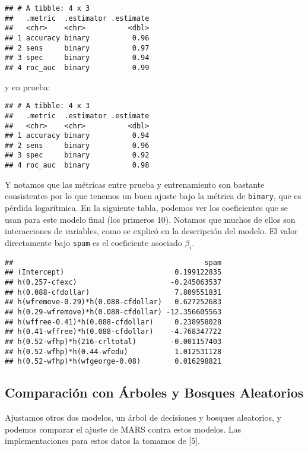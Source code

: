 \documentclass[
]{article}
\begin{document}
\begin{verbatim}
## # A tibble: 4 x 3
##   .metric  .estimator .estimate
##   <chr>    <chr>          <dbl>
## 1 accuracy binary          0.96
## 2 sens     binary          0.97
## 3 spec     binary          0.94
## 4 roc_auc  binary          0.99
\end{verbatim}

y en prueba:

\begin{verbatim}
## # A tibble: 4 x 3
##   .metric  .estimator .estimate
##   <chr>    <chr>          <dbl>
## 1 accuracy binary          0.94
## 2 sens     binary          0.96
## 3 spec     binary          0.92
## 4 roc_auc  binary          0.98
\end{verbatim}

Y notamos que las métricas entre prueba y entrenamiento son bastante
consistentes por lo que tenemos un buen ajuste bajo la métrica de
\texttt{binary}, que es pérdida logarítmica. En la siguiente tabla,
podemos ver los coeficientes que se usan para este modelo final (los
primeros 10). Notamos que muchos de ellos son interacciones de
variables, como se explicó en la descripción del modelo. El valor
directamente bajo \texttt{spam} es el coeficiente asociado \(\beta_i\).

\begin{verbatim}
##                                             spam
## (Intercept)                          0.199122835
## h(0.257-cfexc)                      -0.245063537
## h(0.088-cfdollar)                    7.809551831
## h(wfremove-0.29)*h(0.088-cfdollar)   0.627252683
## h(0.29-wfremove)*h(0.088-cfdollar) -12.356605563
## h(wffree-0.41)*h(0.088-cfdollar)     0.238958028
## h(0.41-wffree)*h(0.088-cfdollar)    -4.768347722
## h(0.52-wfhp)*h(216-crltotal)        -0.001157403
## h(0.52-wfhp)*h(0.44-wfedu)           1.012531128
## h(0.52-wfhp)*h(wfgeorge-0.08)        0.016298821
\end{verbatim}

\hypertarget{comparaciuxf3n-con-uxe1rboles-y-bosques-aleatorios}{%
\subsection{Comparación con Árboles y Bosques
Aleatorios}\label{comparaciuxf3n-con-uxe1rboles-y-bosques-aleatorios}}

Ajustamos otros dos modelos, un árbol de decisiones y bosques
aleatorios, y podemos comparar el ajuste de MARS contra estos modelos.
Las implementaciones para estos datos la tomamos de {[}5{]}.
\end{document}
